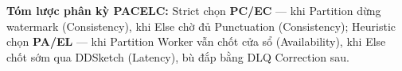 \documentclass[9pt,a4paper]{article}
\begin{document}
\vspace{2pt}
\noindent\textbf{Tóm lược phân kỳ PACELC:} Strict chọn \textbf{PC/EC} --- khi Partition dừng watermark (Consistency), khi Else chờ đủ Punctuation (Consistency); Heuristic chọn \textbf{PA/EL} --- khi Partition Worker vẫn chốt cửa sổ (Availability), khi Else chốt sớm qua DDSketch (Latency), bù đắp bằng DLQ Correction sau.
\end{document}
